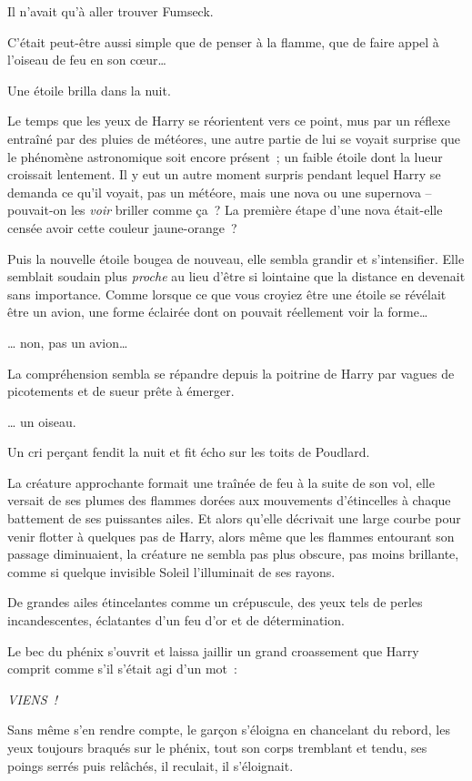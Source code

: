 Il n'avait qu'à aller trouver Fumseck.

C'était peut-être aussi simple que de penser à la flamme, que de faire appel à l'oiseau de feu en son cœur…

Une étoile brilla dans la nuit.

Le temps que les yeux de Harry se réorientent vers ce point, mus par un réflexe entraîné par des pluies de météores, une autre partie de lui se voyait surprise que le phénomène astronomique soit encore présent~; un faible étoile dont la lueur croissait lentement.
Il y eut un autre moment surpris pendant lequel Harry se demanda ce qu'il voyait, pas un météore, mais une nova ou une supernova -- pouvait-on les \emph{voir} briller comme ça~?
La première étape d'une nova était-elle censée avoir cette couleur jaune-orange~?

Puis la nouvelle étoile bougea de nouveau, elle sembla grandir et s'intensifier.
Elle semblait soudain plus \emph{proche} au lieu d'être si lointaine que la distance en devenait sans importance.
Comme lorsque ce que vous croyiez être une étoile se révélait être un avion, une forme éclairée dont on pouvait réellement voir la forme…

… non, pas un avion…

La compréhension sembla se répandre depuis la poitrine de Harry par vagues de picotements et de sueur prête à émerger.

… un oiseau.

Un cri perçant fendit la nuit et fit écho sur les toits de Poudlard.

La créature approchante formait une traînée de feu à la suite de son vol, elle versait de ses plumes des flammes dorées aux mouvements d'étincelles à chaque battement de ses puissantes ailes.
Et alors qu'elle décrivait une large courbe pour venir flotter à quelques pas de Harry, alors même que les flammes entourant son passage diminuaient, la créature ne sembla pas plus obscure, pas moins brillante, comme si quelque invisible Soleil l'illuminait de ses rayons.

De grandes ailes étincelantes comme un crépuscule, des yeux tels de perles incandescentes, éclatantes d'un feu d'or et de détermination.

Le bec du phénix s'ouvrit et laissa jaillir un grand croassement que Harry comprit comme s'il s'était agi d'un mot~:

\emph{VIENS~!}

Sans même s'en rendre compte, le garçon s'éloigna en chancelant du rebord, les yeux toujours braqués sur le phénix, tout son corps tremblant et tendu, ses poings serrés puis relâchés, il reculait, il s'éloignait.

